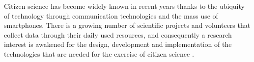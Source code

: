 \documentclass[sigconf]{acmart}
\begin{document}
Citizen science has become widely known in recent years thanks to the ubiquity of technology through communication technologies and the mass use of smartphones. There is a growing number of scientific projects and volunteers that collect data through their daily used resources, and consequently a research interest is awakened for the design, development and implementation of the technologies that are needed for the exercise of citizen science \cite{Preece2016}.


\end{document}
